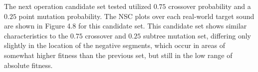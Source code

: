 \documentclass[a4paper,12pt]{report} 	%
\numberwithin{figure}{chapter}
\numberwithin{table}{chapter}
\numberwithin{equation}{chapter}
\begin{document}
\begin{flushleft}
The next operation candidate set tested utilized $0.75$ crossover probability and a $0.25$ point mutation probability. The NSC plots over each real-world target sound are shown in Figure 4.8 for this candidate set.
This candidate set shows similar characteristics to the $0.75$ crossover and $0.25$ subtree mutation set, differing only slightly in the location of the negative segments, which occur in areas of somewhat higher fitness than the previous set, but still in the low range of absolute fitness.


\end{flushleft}
\end{document}
